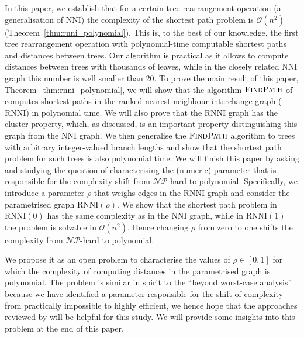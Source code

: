 \documentclass[11pt]{amsart}
\newcommand{\rnni}{\mathrm{RNNI}}
\newcommand{\findpath}{\textsc{FindPath}}
\newcommand{\nni}{\mathrm{NNI}}
\newcommand{\np}{\mathcal{NP}}
\renewcommand{\O}{\mathcal O}
\newcommand{\summary}[1]{} %
\begin{document}
\summary{Paper summary in light of motivation: We've discovered the first efficiently computable distance, given by a parameter range in known tree spaces, and want to understand the reason for the complexity jump -- cite ``Beyond worst-case complexity.''}
In this paper, we establish that for a certain tree rearrangement operation (a generalisation of $\nni$) the complexity of the shortest path problem is $\O(n^2)$ (Theorem~\ref{thm:rnni_polynomial}).
This is, to the best of our knowledge, the first tree rearrangement operation with polynomial-time computable shortest paths and distances between trees.
Our algorithm is practical as it allows to compute distances between trees with thousands of leaves, while in the closely related $\nni$ graph this number is well smaller \autocite{Whidden2016-kl} than 20.
To prove the main result of this paper, Theorem~\ref{thm:rnni_polynomial}, we will show that the algorithm $\findpath$ of \textcite{Collienne2019-ca} computes shortest paths in the ranked nearest neighbour interchange graph ($\rnni$) in polynomial time.
We will also prove that the $\rnni$ graph has the cluster property, which, as discussed, is an important property distinguishing this graph from the $\nni$ graph.
We then generalise the $\findpath$ algorithm to trees with arbitrary integer-valued branch lengths and show that the shortest path problem for such trees is also polynomial time.
We will finish this paper by asking and studying the question of characterising the (numeric) parameter that is responsible for the complexity shift from $\np$-hard to polynomial.
Specifically, we introduce a parameter $\rho$ that weighs edges in the $\rnni$ graph and consider the parametrised graph $\rnni(\rho)$.
We show that the shortest path problem in $\rnni(0)$ has the same complexity as in the $\nni$ graph, while in $\rnni(1)$ the problem is solvable in $\O(n^2)$.
Hence changing $\rho$ from zero to one shifts the complexity from $\np$-hard to polynomial.

We propose it as an open problem to characterise the values of $\rho \in [0,1]$ for which the complexity of computing distances in the parametrised graph is polynomial.
The problem is similar in spirit to the ``beyond worst-case analysis'' \autocite{Roughgarden2019-to} because we have identified a parameter responsible for the shift of complexity from practically impossible to highly efficient, we hence hope that the approaches reviewed by \textcite{Roughgarden2019-to} will be helpful for this study.
We will provide some insights into this problem at the end of this paper.
\end{document}
